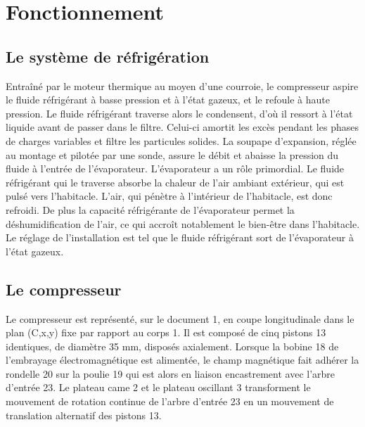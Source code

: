 \documentclass[11pt,oneside]{article}
\begin{document}
\section*{Fonctionnement}
\subsection*{Le système de réfrigération}
Entraîné par le moteur thermique au moyen d'une courroie, le compresseur aspire le fluide réfrigérant à basse pression et à
l'état gazeux, et le refoule à haute pression. Le fluide réfrigérant traverse alors le condensent, d'où il ressort à l'état liquide
avant de passer dans le filtre. Celui-ci amortit les excès pendant les phases de charges variables et filtre les particules
solides. La soupape d'expansion, réglée au montage et pilotée par une sonde, assure le débit et abaisse la pression du
fluide à l'entrée de l'évaporateur.
L'évaporateur a un rôle primordial. Le fluide réfrigérant qui le traverse absorbe la chaleur de l'air ambiant extérieur, qui est
pulsé vers l'habitacle. L'air, qui pénètre à l'intérieur de l'habitacle, est donc refroidi. De plus la capacité réfrigérante de
l'évaporateur permet la déshumidification de l'air, ce qui accroît notablement le bien-être dans l'habitacle. Le réglage de
l'installation est tel que le fluide réfrigérant sort de l'évaporateur à l'état gazeux.

\subsection*{Le compresseur}
Le compresseur est représenté, sur le document 1, en coupe longitudinale dans le plan (C,x,y) fixe par rapport au corps 1. Il
est composé de cinq pistons 13 identiques, de diamètre 35 mm, disposés axialement. Lorsque la bobine 18 de l'embrayage
électromagnétique est alimentée, le champ magnétique fait adhérer la rondelle 20 sur la poulie 19 qui est alors en liaison
encastrement avec l'arbre d'entrée 23. Le plateau came 2 et le plateau oscillant 3 transforment le mouvement de rotation
continue de l'arbre d'entrée 23 en un mouvement de translation alternatif des pistons 13.
\end{document}
